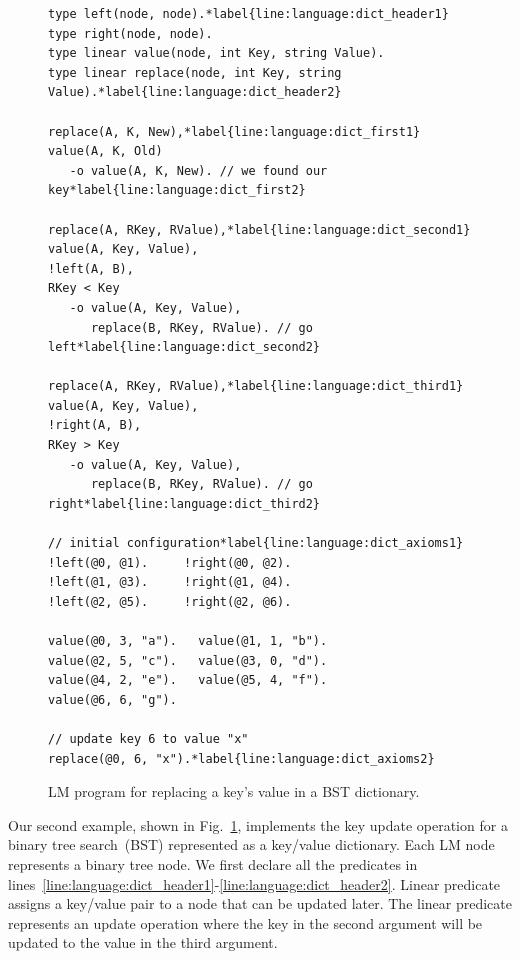 
\begin{figure}[ht]
\begin{Verbatim}[numbers=right,fontsize=\codesize,commandchars=\*\{\}]
type left(node, node).*label{line:language:dict_header1}
type right(node, node).
type linear value(node, int Key, string Value).
type linear replace(node, int Key, string Value).*label{line:language:dict_header2}

replace(A, K, New),*label{line:language:dict_first1}
value(A, K, Old)
   -o value(A, K, New). // we found our key*label{line:language:dict_first2}

replace(A, RKey, RValue),*label{line:language:dict_second1}
value(A, Key, Value),
!left(A, B),
RKey < Key
   -o value(A, Key, Value),
      replace(B, RKey, RValue). // go left*label{line:language:dict_second2}

replace(A, RKey, RValue),*label{line:language:dict_third1}
value(A, Key, Value),
!right(A, B),
RKey > Key
   -o value(A, Key, Value),
      replace(B, RKey, RValue). // go right*label{line:language:dict_third2}

// initial configuration*label{line:language:dict_axioms1}
!left(@0, @1).     !right(@0, @2).
!left(@1, @3).     !right(@1, @4). 
!left(@2, @5).     !right(@2, @6).

value(@0, 3, "a").   value(@1, 1, "b").
value(@2, 5, "c").   value(@3, 0, "d").
value(@4, 2, "e").   value(@5, 4, "f").
value(@6, 6, "g").

// update key 6 to value "x"
replace(@0, 6, "x").*label{line:language:dict_axioms2}
\end{Verbatim}
\caption{LM program for replacing a key's value in a BST dictionary.}
\label{code:btree_replace}
\end{figure}

Our second example, shown in Fig.~\ref{code:btree_replace}, implements the key
update operation for a binary tree search~(BST) represented as a key/value
dictionary. Each LM node represents a binary tree node. We first declare all the
predicates in
lines~\ref{line:language:dict_header1}-\ref{line:language:dict_header2}.  Linear
predicate  assigns a key/value pair to a node that can be updated
later. The  linear predicate represents an update operation
where the key in the second argument will be updated to the value in the third
argument.

